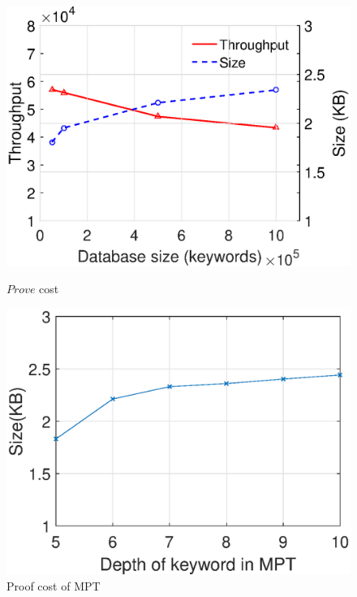 \begin{figure}[bhpt]
  \hspace{-40.0pt}
  \par \vspace{-10.pt}
  \hspace{-36.0pt}

  \begin{minipage}[b]{0.48 \textwidth}
    \includegraphics[width=\textwidth]{expr/prove}
    \caption{$Prove$ cost}
    \label{fig:prove}
  \end{minipage}
  \begin{minipage}[b]{0.48 \textwidth}
    \includegraphics[width=\textwidth]{expr/proof}
    \caption{Proof cost of MPT}
    \label{fig:proof}
  \end{minipage}


\end{figure}

